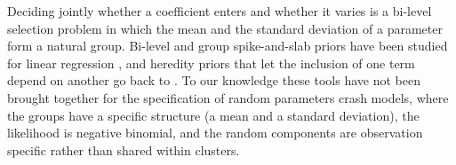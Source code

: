 Deciding jointly whether a coefficient enters and whether it varies is a bi-level selection problem in which the mean and the standard deviation of a parameter form a natural group. Bi-level and group spike-and-slab priors have been studied for linear regression \citep{xu2015bayesian, yang2020consistent, bai2022spike}, and heredity priors that let the inclusion of one term depend on another go back to \citet{chipman1996bayesian}. To our knowledge these tools have not been brought together for the specification of random parameters crash models, where the groups have a specific structure (a mean and a standard deviation), the likelihood is negative binomial, and the random components are observation specific rather than shared within clusters. 
